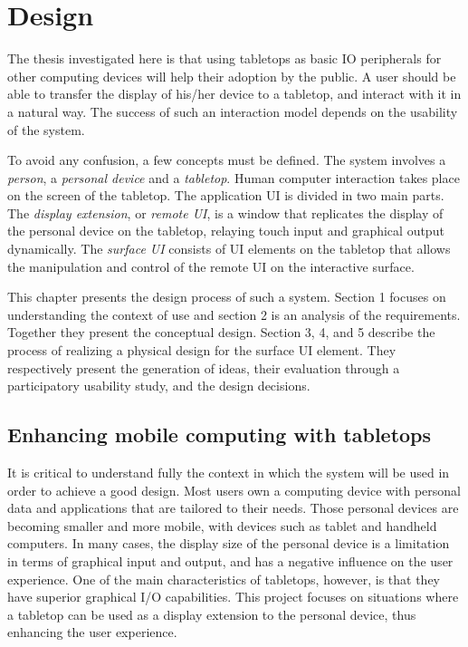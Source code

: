 

\chapter{Design}

The thesis investigated here is that using tabletops as basic IO peripherals for other computing devices will help their adoption by the public.
A user should be able to transfer the display of his/her device to a tabletop, and interact with it in a natural way.
The success of such an interaction model depends on the usability of the system. 

To avoid any confusion, a few concepts must be defined.
The system involves a \emph{person}, a \emph{personal device} and a \emph{tabletop}.
Human computer interaction takes place on the screen of the tabletop.
The application UI is divided in two main parts.
The \emph{display extension}, or \emph{remote UI}, is a window that replicates the display of the personal device on the tabletop, relaying touch input and graphical output dynamically.
The \emph{surface UI} consists of UI elements on the tabletop that allows the manipulation and control of the remote UI on the interactive surface.

This chapter presents the design process of such a system.
Section 1 focuses on understanding the context of use and section 2 is an analysis of the requirements. Together they present the conceptual design.
Section 3, 4, and 5 describe the process of realizing a physical design for the surface UI element. They respectively present the generation of ideas, their evaluation through a participatory usability study, and the design decisions.

\section{Enhancing mobile computing with tabletops}

It is critical to understand fully the context in which the system will be used in order to achieve a good design.
Most users own a computing device with personal data and applications that are tailored to their needs.
Those personal devices are becoming smaller and more mobile, with devices such as tablet and handheld computers.
In many cases, the display size of the personal device is a limitation in terms of graphical input and output, and has a negative influence on the user experience.
One of the main characteristics of tabletops, however, is that they have superior graphical I/O capabilities.
This project focuses on situations where a tabletop can be used as a display extension to the personal device, thus enhancing the user experience.

